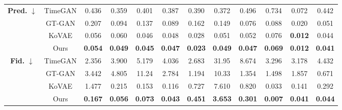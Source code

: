 \documentclass{article}
\theoremstyle{plain}
\theoremstyle{definition}
\theoremstyle{remark}
\begin{document}
{\begin{table*}[!t]
{\begin{tabular}{cc|cccccccccc}
    \multirow{4}{*}{\textbf{Pred.} $\downarrow$} 
      & TimeGAN 
         & 0.436 
         & 0.359 
         & 0.401 
         & 0.387 
         & 0.390 
         & 0.372 
         & 0.496 
         & 0.734 
         & 0.072 
         & 0.442 \\
      & GT-GAN  
         & 0.207 
         & 0.094 
         & 0.137 
         & 0.089 
         & 0.162 
         & 0.149 
         & 0.076 
         & 0.088 
         & 0.020 
         & 0.051 \\
      & KoVAE   
         & 0.056 
         & 0.060 
         & 0.046 
         & 0.048 
         & 0.028 
         & 0.051 
         & 0.052 
         & 0.076 
         & \cellcolor{blue!10}\textbf{0.012}
         & 0.044 \\
      & Ours    
         & \cellcolor{blue!10}\textbf{0.054}
         & \cellcolor{blue!10}\textbf{0.049}
         & \cellcolor{blue!10}\textbf{0.045}
         & \cellcolor{blue!10}\textbf{0.047}
         & \cellcolor{blue!10}\textbf{0.023}
         & \cellcolor{blue!10}\textbf{0.049}
         & \cellcolor{blue!10}\textbf{0.047}
         & \cellcolor{blue!10}\textbf{0.069}
         & \cellcolor{blue!10}\textbf{0.012} 
         & \cellcolor{blue!10}\textbf{0.041} \\
    \midrule
    
    \multirow{4}{*}{\textbf{Fid.} $\downarrow$} 
      & TimeGAN 
         & 2.356 
         & 3.900 
         & 5.179 
         & 4.036 
         & 2.683 
         & 31.95 
         & 8.674 
         & 3.296 
         & 3.178 
         & 4.432 \\
      & GT-GAN  
         & 3.442 
         & 4.805 
         & 11.24 
         & 2.784 
         & 1.194 
         & 10.33 
         & 1.354 
         & 1.498 
         & 1.857 
         & 0.671 \\
      & KoVAE   
         & 1.477 
         & 0.215 
         & 0.153 
         & 0.116 
         & 0.727 
         & 7.610 
         & 0.820 
         & 0.033 
         & 0.141 
         & 0.292 \\
      & Ours    
         & \cellcolor{blue!10}\textbf{0.167}
         & \cellcolor{blue!10}\textbf{0.056}
         & \cellcolor{blue!10}\textbf{0.073}
         & \cellcolor{blue!10}\textbf{0.043}
         & \cellcolor{blue!10}\textbf{0.451}
         & \cellcolor{blue!10}\textbf{3.653}
         & \cellcolor{blue!10}\textbf{0.301}
         & \cellcolor{blue!10}\textbf{0.007}
         & \cellcolor{blue!10}\textbf{0.041}
         & \cellcolor{blue!10}\textbf{0.044} \\
    \midrule
    

\end{tabular}}
\end{table*}}
\end{document}
